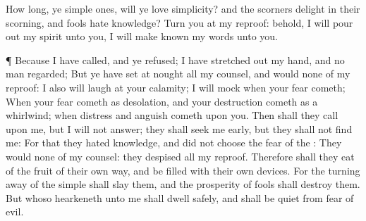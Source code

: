 {How long, ye simple
ones, will ye
love
simplicity? and the
scorners
delight in their
scorning, and
fools
hate
knowledge?
Turn you at my
reproof: behold, I will pour
out my
spirit unto you, I will make
known my
words unto you.
\par }{\PP {}¶ Because I have
called, and ye
refused; I have stretched
out my
hand, and no man
regarded;
But ye have set at
nought all my
counsel, and
would none of my
reproof:
I also will
laugh at your
calamity; I will
mock when your
fear
cometh;
When your
fear
cometh as
desolation, and your
destruction
cometh as a
whirlwind; when
distress and
anguish
cometh upon you.
Then shall they
call upon me, but I will not
answer; they shall seek me
early, but they shall not
find me:
For that they
hated
knowledge, and did not
choose the
fear of the
{}:
They
would none of my
counsel: they
despised all my
reproof.
Therefore shall they
eat of the
fruit of their own
way, and be
filled with their own
devices.
For the turning
away of the
simple shall
slay them, and the
prosperity of
fools shall
destroy them.
But whoso
hearkeneth unto me shall
dwell
safely, and shall be
quiet from
fear of
evil.

}

